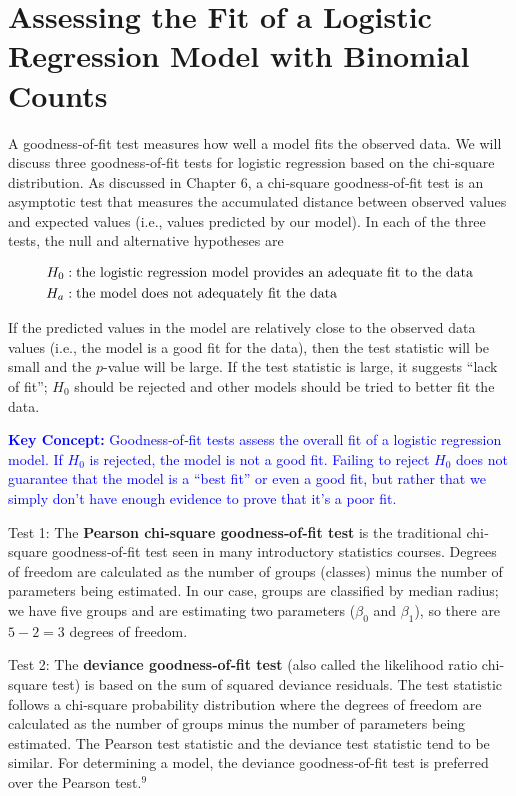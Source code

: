 \documentclass[
]{book}
\begin{document}
\hypertarget{assessing-the-fit-of-a-logistic-regression-model-with-binomial-counts}{%
\section{Assessing the Fit of a Logistic Regression Model with Binomial Counts}\label{assessing-the-fit-of-a-logistic-regression-model-with-binomial-counts}}

A goodness‐of‐fit test measures how well a model fits the observed data. We will discuss three goodness‐of‐fit tests for logistic regression based on the chi‐square distribution. As discussed in Chapter 6, a chi‐square goodness‐of‐fit test is an asymptotic test that measures the accumulated distance between observed values and expected values (i.e., values predicted by our model). In each of the three tests, the null and alternative hypotheses are

\begin{align}
H_0:\;&\text{the logistic regression model provides an adequate fit to the data} \notag \\
H_a:\;&\text{the model does not adequately fit the data} \notag
\end{align}

If the predicted values in the model are relatively close to the observed data values (i.e., the model is a good fit for the data), then the test statistic will be small and the \(p\)-value will be large. If the test statistic is large, it suggests ``lack of fit''; \(H_0\) should be rejected and other models should be tried to better fit the data.

\textbf{\textcolor{blue}{Key Concept:}}
\textcolor{blue}{Goodness‐of‐fit tests assess the overall fit of a logistic regression model. If $H_0$ is rejected, the model is not a good fit. Failing to reject $H_0$ does not guarantee that the model is a “best fit” or even a good fit, but rather that we simply don’t have enough evidence to prove that it’s a poor fit.}

Test 1: The \textbf{Pearson chi‐square goodness‐of‐fit test} is the traditional chi‐square goodness‐of‐fit test seen in many introductory statistics courses. Degrees of freedom are calculated as the number of groups (classes) minus the number of parameters being estimated. In our case, groups are classified by median radius; we have five groups and are estimating two parameters (\(\beta_0\) and \(\beta_1\)), so there are \(5 - 2 = 3\) degrees of freedom.

Test 2: The \textbf{deviance goodness‐of‐fit test} (also called the likelihood ratio chi‐square test) is based on the sum of squared deviance residuals. The test statistic follows a chi‐square probability distribution where the degrees of freedom are calculated as the number of groups minus the number of parameters being estimated. The Pearson test statistic and the deviance test statistic tend to be similar. For determining a model, the deviance goodness‐of‐fit test is preferred over the Pearson test.\(^9\)
\end{document}
